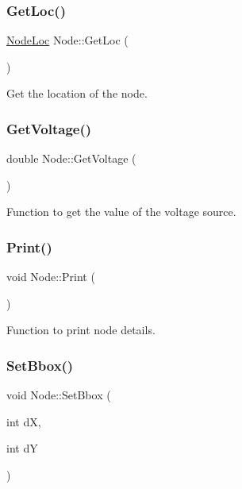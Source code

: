 \subsubsection{\texorpdfstring{Get\+Loc()}{GetLoc()}}
{\footnotesize\ttfamily \hyperlink{node_8h_a8457e7507941d06122aaf5c4ac260995}{Node\+Loc} Node\+::\+Get\+Loc (\begin{DoxyParamCaption}{ }\end{DoxyParamCaption})}



Get the location of the node. 

\mbox{\label{classNode_ad924c345106b6e7b0847762290052fac}} 
\subsubsection{\texorpdfstring{Get\+Voltage()}{GetVoltage()}}
{\footnotesize\ttfamily double Node\+::\+Get\+Voltage (\begin{DoxyParamCaption}{ }\end{DoxyParamCaption})}



Function to get the value of the voltage source. 

\mbox{\label{classNode_a297f77156d63d571f7014c78f79841af}} 
\subsubsection{\texorpdfstring{Print()}{Print()}}
{\footnotesize\ttfamily void Node\+::\+Print (\begin{DoxyParamCaption}{ }\end{DoxyParamCaption})}



Function to print node details. 

\mbox{\label{classNode_ace2ee184ee4290c20cffc937435de6fc}} 
\subsubsection{\texorpdfstring{Set\+Bbox()}{SetBbox()}}
{\footnotesize\ttfamily void Node\+::\+Set\+Bbox (\begin{DoxyParamCaption}\item[{int}]{dX,  }\item[{int}]{dY }\end{DoxyParamCaption})}



